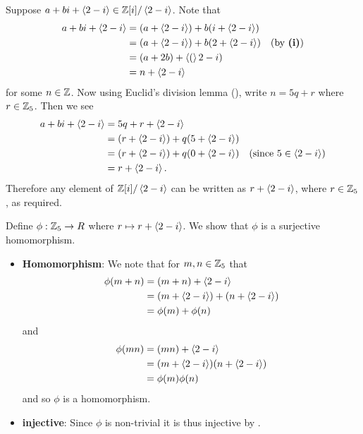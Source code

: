 \begin{questions}
\begin{partquestions}{\roman*}
        \item Suppose $a + bi + \left\langle2-i\right\rangle \in \mathbb{Z}[i]/\left\langle2-i\right\rangle$. Note that
        \begin{align*}
            a + bi + \left\langle2-i\right\rangle &= (a+\left\langle2-i\right\rangle) + b(i + \left\langle2-i\right\rangle)\\
            &= (a+\left\langle2-i\right\rangle) + b(2 + \left\langle2-i\right\rangle) & (\text{by }\textbf{(i)})\\
            &= (a + 2b) + \left\langle(\right\rangle2-i)\\
            &= n + \left\langle2-i\right\rangle
        \end{align*}
        for some $n \in \mathbb{Z}$. Now using Euclid's division lemma (), write $n = 5q + r$ where $r \in \mathbb{Z}_5$. Then we see
        \begin{align*}
            a + bi + \left\langle2-i\right\rangle &= 5q + r + \left\langle2-i\right\rangle\\
            &= (r + \left\langle2-i\right\rangle) + q(5 + \left\langle2-i\right\rangle)\\
            &= (r + \left\langle2-i\right\rangle) + q(0 + \left\langle2-i\right\rangle) & (\text{since } 5 \in \left\langle2-i\right\rangle)\\
            &= r + \left\langle2-i\right\rangle.
        \end{align*}
        Therefore any element of $\mathbb{Z}[i]/\left\langle2-i\right\rangle$ can be written as $r + \left\langle2-i\right\rangle$, where $r \in \mathbb{Z}_5$, as required.

        \item Define $\phi: \mathbb{Z}_5 \to R$ where $r \mapsto r + \left\langle2-i\right\rangle$. We show that $\phi$ is a surjective homomorphism.
        \begin{itemize}
            \item \textbf{Homomorphism}: We note that for $m,n \in \mathbb{Z}_5$ that
            \begin{align*}
                \phi(m+n) &= (m+n) + \left\langle2-i\right\rangle\\
                &= (m + \left\langle2-i\right\rangle) + (n + \left\langle2-i\right\rangle)\\
                &= \phi(m) + \phi(n)
            \end{align*}
            and
            \begin{align*}
                \phi(mn) &= (mn) + \left\langle2-i\right\rangle\\
                &= (m + \left\langle2-i\right\rangle)(n + \left\langle2-i\right\rangle)\\
                &= \phi(m)\phi(n)
            \end{align*}
            and so $\phi$ is a homomorphism.

            \item \textbf{injective}: Since $\phi$ is non-trivial it is thus injective by .


\end{itemize}
\end{partquestions}
\end{questions}
